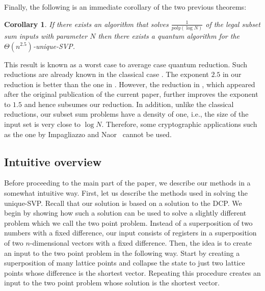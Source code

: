 \documentclass[11pt]{article}
\newtheorem{corollary}[theorem]{Corollary}
\begin{document}
Finally, the following is an immediate corollary of the two previous theorems:
\begin{corollary}
If there exists an algorithm that solves $\frac{1}{poly(\log N)}$ of the legal subset sum inputs with parameter $N$
then there exists a quantum algorithm for the $\Theta(n^{2.5})$-unique-SVP.
\end{corollary}
This result is known as a worst case to average case quantum reduction. Such reductions are already known in the
classical case \cite{Ajtai96atow,Cai98atow,CaiNerurkar97atow,Micciancio02atow,RegevPKE}. The exponent $2.5$ in our
reduction is better than the one in \cite{Ajtai96atow,Cai98atow,CaiNerurkar97atow,Micciancio02atow}. However, the
reduction in \cite{RegevPKE}, which appeared after the original publication of the current paper, further improves the
exponent to $1.5$ and hence subsumes our reduction. In addition, unlike the classical reductions, our subset sum
problems have a density of one, i.e., the size of the input set is very close to $\log N$. Therefore, some
cryptographic applications such as the one by Impagliazzo and Naor~\cite{ImpagliazzoNaor} cannot be used.

\subsection*{Intuitive overview}

Before proceeding to the main part of the paper, we describe our methods in a somewhat intuitive way. First, let us
describe the methods used in solving the unique-SVP. Recall that our solution is based on a solution to the DCP. We
begin by showing how such a solution can be used to solve a slightly different problem which we call the two point
problem. Instead of a superposition of two numbers with a fixed difference, our input consists of registers in a
superposition of two $n$-dimensional vectors with a fixed difference. Then, the idea is to create an input to the two
point problem in the following way. Start by creating a superposition of many lattice points and collapse the state to
just two lattice points whose difference is the shortest vector. Repeating this procedure creates an input to the two
point problem whose solution is the shortest vector.
\end{document}
